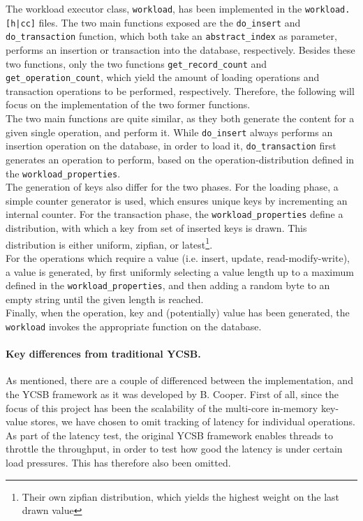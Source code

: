 \documentclass[11pt]{article} %
\begin{document}
The workload executor class, \verb|workload|, has been implemented in the \verb=workload.[h|cc]= files. The two main functions exposed are the \verb|do_insert| and \verb|do_transaction| function, which both take an \verb|abstract_index| as parameter, performs an insertion or transaction into the database, respectively. Besides these two functions, only the two functions \verb|get_record_count| and \verb|get_operation_count|, which yield the amount of loading operations and transaction operations to be performed, respectively. Therefore, the following will focus on the implementation of the two former functions.\\

The two main functions are quite similar, as they both generate the content for a given single operation, and perform it. While \verb|do_insert| always performs an insertion operation on the database, in order to load it, \verb|do_transaction| first generates an operation to perform, based on the operation-distribution defined in the \verb|workload_properties|. \\

The generation of keys also differ for the two phases. For the loading phase, a simple counter generator is used, which ensures unique keys by incrementing an internal counter. For the transaction phase, the \verb|workload_properties| define a distribution, with which a key from set of inserted keys is drawn. This distribution is either uniform, zipfian, or latest\footnote{Their own zipfian distribution, which yields the highest weight on the last drawn value}. \\

For the operations which require a value (i.e. insert, update, read-modify-write), a value is generated, by first uniformly selecting a value length up to a maximum defined in the \verb|workload_properties|, and then adding a random byte to an empty string until the given length is reached.\\

Finally, when the operation, key and (potentially) value has been generated, the \verb|workload| invokes the appropriate function on the database.\\
\paragraph{Key differences from traditional YCSB.} As mentioned, there are a couple of differenced between the implementation, and the YCSB framework as it was developed by B. Cooper. First of all, since the focus of this project has been the scalability of the multi-core in-memory key-value stores, we have chosen to omit tracking of latency for individual operations. As part of the latency test, the original YCSB framework enables threads to throttle the throughput, in order to test how good the latency is under certain load pressures. This has therefore also been omitted. \\
\end{document}
